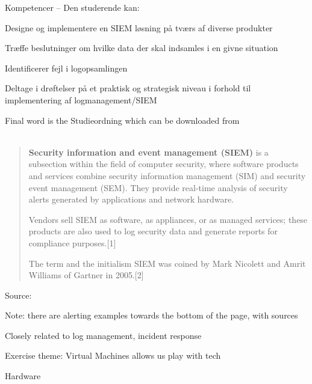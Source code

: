 \documentclass[Screen16to9,17pt]{foils}
\begin{document}
Kompetencer -- Den studerende kan:
\begin{list2}
\item Designe og implementere en SIEM løsning på tværs af diverse produkter
\item Træffe beslutninger om hvilke data der skal indsamles i en givne situation
\item Identificerer fejl i logopsamlingen
\item Deltage i drøftelser på et praktisk og strategisk niveau i forhold til
implementering af logmanagement/SIEM
\end{list2}

Final word is the Studieordning which can be downloaded from\\
{\footnotesize {}\\
}




\begin{quote}
{\bf Security information and event management (SIEM)} is a subsection within the field of computer security, where software products and services combine security information management (SIM) and security event management (SEM). They provide real-time analysis of security alerts generated by applications and network hardware.

  Vendors sell SIEM as software, as appliances, or as managed services; these products are also used to log security data and generate reports for compliance purposes.[1]

  The term and the initialism SIEM was coined by Mark Nicolett and Amrit Williams of Gartner in 2005.[2]
\end{quote}
Source: 

\begin{list2}
  \item Note: there are alerting examples towards the bottom of the page, with sources
  \item Closely related to log management, incident response
\end{list2}



Exercise theme: Virtual Machines allows us play with tech

Hardware
\end{document}

